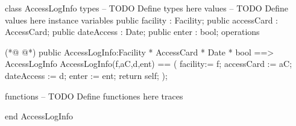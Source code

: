 \begin{vdmpp}[breaklines=true]
class AccessLogInfo
types
-- TODO Define types here
values
-- TODO Define values here
instance variables
 public facility : Facility;
 public accessCard : AccessCard;
 public dateAccess : Date;
 public enter :  bool;
operations

(*@
\label{AccessLogInfo:13}
@*)
public AccessLogInfo:Facility * AccessCard * Date * bool ==> AccessLogInfo
 AccessLogInfo(f,aC,d,ent) == (
 facility:= f;
 accessCard := aC;
 dateAccess := d;
 enter := ent;
return self;
 );

functions
-- TODO Define functiones here
traces

end AccessLogInfo
\end{vdmpp}
